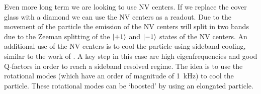 Even more long term we are looking to use NV centers. If we replace the cover glass with a diamond we can use the NV centers as a readout. Due to the movement of the particle the emission of the NV centers will split in two bands due to the Zeeman splitting of the $\ket{+1}$ and $\ket{-1}$ states of the NV centers. An additional use of the NV centers is to cool the particle using sideband cooling, similar to the work of \textcite{delord_spin-cooling_2020}. A key step in this case are high eigenfrequencies and good Q-factors in order to reach a sideband resolved regime. The idea is to use the rotational modes (which have an order of magnitude of \qty{1}{\kilo\hertz}) to cool the particle. These rotational modes can be `boosted' by using an elongated particle\cite{huillery_spin-mechanics_2020}.
